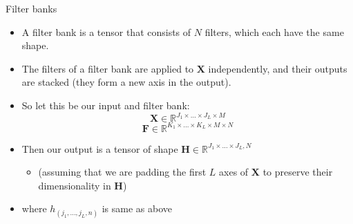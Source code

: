 \begin{vbframe}{Filter banks}

\vfill

\begin{itemize}
	\item A filter bank is a tensor that consists of $N$ filters, which each have the same shape.
	\item The filters of a filter bank are applied to $\mathbf{X}$ independently, and their outputs are stacked (they form a new axis in the output).
	\item So let this be our input and filter bank:
	$$\mathbf{X} \in \mathbb{R}^{J_1 \times \ldots \times J_L \times M}$$
	$$\mathbf{F} \in \mathbb{R}^{K_1 \times \ldots \times K_L \times M \times N}$$
	\item Then our output is a tensor of shape $\mathbf{H} \in \mathbb{R}^{J_1 \times \ldots \times J_L, N}$
		\begin{itemize}
			\item (assuming that we are padding the first $L$ axes of $\mathbf{X}$ to preserve their dimensionality in $\mathbf{H}$)
		\end{itemize}
	\item where $h_{(j_1, \ldots, j_L, n)}$ is same as above
\end{itemize}

\vfill

\end{vbframe}


